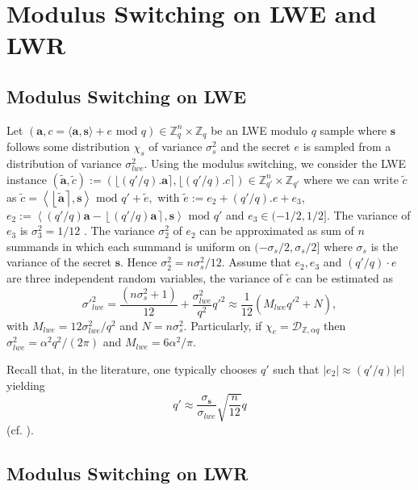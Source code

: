 \documentclass{cta-author}
\begin{document}
\section{Modulus Switching  on LWE and LWR} \label{sec5}

\subsection{Modulus Switching  on LWE }


Let $(\mathbf{a},c=\langle \mathbf{a},\mathbf{s}\rangle+e  \text{ mod } q) \in \mathbb{Z}_q^n \times \mathbb{Z}_q$ be an LWE modulo $q$ sample where $\mathbf{s}$ follows some distribution $\chi_s$ of variance $\sigma_s^2$ and the secret $e$ is sampled from a distribution of variance $\sigma_{lwe}^2$. Using the modulus switching, we consider the LWE instance $(\tilde{\mathbf{a}},\tilde{c}):=(\lfloor (q'/q).\mathbf{a}\rceil,\lfloor(q'/q).c \rceil) \in \mathbb{Z}_{q'}^n \times \mathbb{Z}_{q'}$ where we can write $\tilde{c}$ as 
$\tilde{c}=\left\langle \left\lfloor \tilde{\mathbf{a}} \right\rceil, \mathbf{s}\right\rangle \text{ mod } q'+\tilde{e},$
with $\tilde{e}:=e_2+(q'/q).e+e_3$, $e_2:=\left\langle (q'/q) \mathbf{a}-\left\lfloor (q'/q) \mathbf{a} \right\rceil, \mathbf{s}\right\rangle \text{ mod } q'$ and $ e_3 \in (-1/2,1/2]$. The variance of $e_3$ is $\sigma_3^2=1/12$ . The variance $\sigma^2_2$ of $e_2$ can be approximated as sum of $n$ summands in which each summand is uniform on $(-\sigma_s/2,\sigma_s/2]$ where $\sigma_s$ is the variance of the secret $\mathbf{s}$. Hence  $\sigma^2_2=n\sigma^2_s/12.$ 
Assume that $e_2, e_3$ and $(q'/q)\cdot e$ are three independent random variables,  the variance of $\tilde{e}$ can be estimated as 
\begin{equation}\label{keylwe}
{\sigma'}_{lwe}^2=\frac{(n\sigma_s^2+1)}{12}+\frac{\sigma_{lwe}^2}{q^2} q'^2\approx \frac{1}{12}(M_{lwe}q'^2+N),
\end{equation} with $M_{lwe}=12\sigma_{lwe}^2/q^2 $ and $N=n\sigma_s^2$. Particularly, if $\chi_e =\mathcal{D}_{\mathbb{Z},\alpha q}$ then $\sigma_{lwe}^2=\alpha^2 q^2/(2 \pi)$ and $M_{lwe}=6\alpha^2/\pi$.


Recall that, in the literature,  one typically chooses $q'$ such  that $\left\vert e_2 \right \vert \approx (q'/q)|e|$ yielding $$ q' \approx \frac{\sigma_{\mathbf{s}}}{\sigma_{lwe}}\sqrt{\frac{n}{12}}q$$ (cf. \cite{APS15}).

\subsection{Modulus Switching on LWR}
\end{document}
